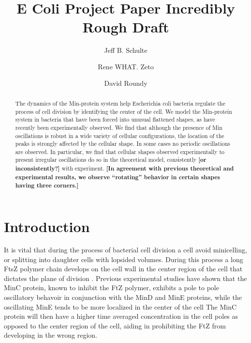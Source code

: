 \documentclass[letterpaper,twocolumn,amsmath,amssymb,pre]{revtex4-1}
\newcommand{\red}[1]{{\bf \color{red} #1}}
\newcommand{\fixme}[1]{\red{[#1]}}
\begin{document}
\title{E Coli Project Paper Incredibly Rough Draft}

\author{Jeff B. Schulte}
\author{Rene WHAT. Zeto}
\author{David Roundy}

\begin{abstract}
  The dynamics of the Min-protein system help Escherichia coli
  bacteria regulate the process of cell division by identifying the
  center of the cell.  We model the Min-protein system in bacteria
  that have been forced into unusual flattened shapes, as have
  recently been experimentally observed.  We find that although the
  presence of Min oscillations is robust in a wide variety of cellular
  configurations, the location of the peaks is strongly affected by
  the cellular shape.  In some cases no periodic oscillations are
  observed.  In particular, we find that cellular shapes observed
  experimentally to present irregular oscillations do so in the
  theoretical model, consistently \fixme{or inconsistently?} with
  experiment.  \fixme{In agreement with previous theoretical and
    experimental results, we observe ``rotating'' behavior in certain
    shapes having three corners.}
\end{abstract}

\maketitle

\section{Introduction}
It is vital that during the process of bacterial cell division a cell
avoid minicelling, or splitting into daughter cells with lopsided
volumes.  During this process a long FtsZ polymer chain develops on
the cell wall in the center region of the cell that dictates the plane
of division\cite{adams2009bacterial}
\cite{lutkenhaus2007assembly}. Previous experimental studies have
shown that the MinC protein, known to inhibit the FtZ
polymer\cite{shen2010examination}, exhibits a pole to pole oscillatory
behavoir in conjunction with the MinD and MinE proteins, while the
oscillating MinE tends to be more localized in the center of the cell
\cite{hu1999topological} \cite{fu2001mine} \cite{shapiro2009and}
\cite{yu1999ftsz} \cite{raskin1999rapid}The MinC protein will then have a higher time
averaged concentration in the cell poles as opposed to the center
region of the cell, aiding in prohibiting the FtZ from developing in the wrong
region.
\end{document}
